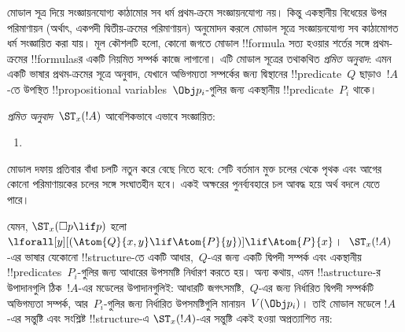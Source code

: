 \documentclass[../../../include/open-logic-section]{subfiles}
\begin{document}


মোডাল সূত্র দিয়ে সংজ্ঞায়নযোগ্য কাঠামোর সব ধর্ম প্রথম-ক্রমে সংজ্ঞায়নযোগ্য নয়। কিন্তু একস্থানীয় বিধেয়ের উপর পরিমাণায়ন (অর্থাৎ, একপদী দ্বিতীয়-ক্রমের পরিমাণায়ন) অনুমোদন করলে মোডাল সূত্রে সংজ্ঞায়নযোগ্য সব কাঠামোগত ধর্ম সংজ্ঞায়িত করা যায়। মূল কৌশলটি হলো, কোনো জগতে মোডাল !!{formula} সত্য হওয়ার শর্তের সঙ্গে প্রথম-ক্রমের !!{formula}sর একটি নিয়মিত সম্পর্ক কাজে লাগানো। এটি মোডাল সূত্রের তথাকথিত \emph{প্রমিত অনুবাদ}: এমন একটি ভাষার প্রথম-ক্রমের সূত্রে অনুবাদ, যেখানে অভিগম্যতা সম্পর্কের জন্য দ্বিস্থানের !!{predicate}~$Q$ ছাড়াও~$!A$-তে উপস্থিত !!{propositional variable}s~$\Obj p_i$-গুলির জন্য একস্থানীয় !!{predicate}~$P_i$ থাকে।

\begin{defn}
  \emph{প্রমিত অনুবাদ}~$\ST_x(!A)$ আবেশিকভাবে এভাবে সংজ্ঞায়িত:
  \begin{enumerate}
  \item {}
  \end{enumerate}
  মোডাল দফায় প্রতিবার বাঁধা চলটি নতুন করে বেছে নিতে হবে: সেটি বর্তমান মুক্ত চলের থেকে পৃথক এবং আগের কোনো পরিমাণায়কের চলের সঙ্গে সংঘাতহীন হবে। একই অক্ষরের পুনর্ব্যবহারে চল আবদ্ধ হয়ে অর্থ বদলে যেতে পারে।
\end{defn}

যেমন, $\ST_x(\Box p \lif p)$ হলো $\lforall[y][(\Atom{Q}{x,y}
  \lif \Atom{P}{y})] \lif \Atom{P}{x}$।~$\ST_x(!A)$-এর ভাষার যেকোনো !!{structure}-তে একটি আধার,~$Q$-এর জন্য একটি দ্বিপদী সম্পর্ক এবং একস্থানীয় !!{predicate}s~$P_i$-গুলির জন্য আধারের উপসমষ্টি নির্ধারণ করতে হয়। অন্য কথায়, এমন !!a{structure}-র উপাদানগুলি ঠিক~$!A$-এর মডেলের উপাদানগুলিই: আধারটি জগৎসমষ্টি,~$Q$-এর জন্য নির্ধারিত দ্বিপদী সম্পর্কটি অভিগম্যতা সম্পর্ক, আর~$P_i$-গুলির জন্য নির্ধারিত উপসমষ্টিগুলি মানায়ন~$V(\Obj p_i)$। তাই মোডাল মডেলে $!A$-এর সন্তুষ্টি এবং সংশ্লিষ্ট !!{structure}-এ $\ST_x(!A)$-এর সন্তুষ্টি একই হওয়া অপ্রত্যাশিত নয়:
\end{document}
